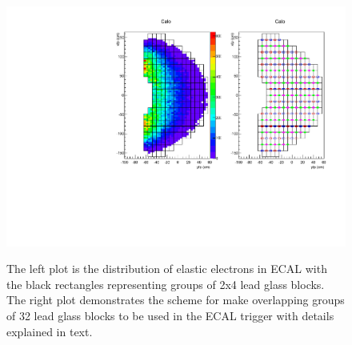 \documentclass{article}
\begin{document}
\begin{figure}
  \centering
  \includegraphics[width=\textwidth]{figs/cfpa.pdf}\\
  \caption{The left plot is the distribution of elastic electrons in ECAL with the black rectangles representing
groups of 2x4 lead glass blocks. The right plot demonstrates
the scheme for make overlapping groups of 32 lead glass blocks to be used in the ECAL trigger with
details explained in text.  }\label{fig:ECALTrig}
\end{figure}
\end{document}
